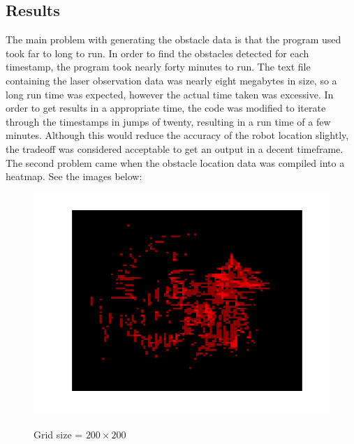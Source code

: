 {		\pagebreak
	\subsection{Results}
		The main problem with generating the obstacle data is that the program used took far to long to run. In order to find the obstacles detected for each timestamp, the program took nearly forty minutes to run. The text file containing the laser observation data was nearly eight megabytes in size, so a long run time was expected, however the actual time taken was excessive. In order to get results in a appropriate time, the code was modified to iterate through the timestamps in jumps of twenty, resulting in a run time of a few minutes. Although this would reduce the accuracy of the robot location slightly, the tradeoff was considered acceptable to get an output in a decent timeframe.\newline
		The second problem came when the obstacle location data was compiled into a heatmap. See the images below:\newline
		
				\begin{figure}[position = here]
					\begin{centering}
						\includegraphics[scale=1]{./images/q2/heatmap_obstacles_200.png}\\
						\caption{Grid size = ${200 \times 200}$}
					\end{centering}
				\end{figure}
				\newline
				
}
